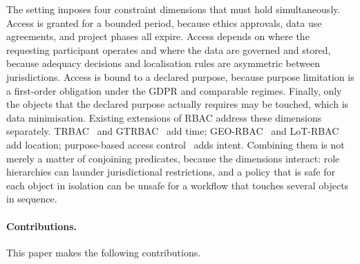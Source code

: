 \documentclass[11pt]{article}
\theoremstyle{definition}
\theoremstyle{plain}
\theoremstyle{remark}
\begin{document}
The setting imposes four constraint dimensions that must hold simultaneously.
Access is granted for a bounded period, because ethics approvals, data use
agreements, and project phases all expire. Access depends on where the
requesting participant operates and where the data are governed and stored,
because adequacy decisions and localisation rules are asymmetric between
jurisdictions. Access is bound to a declared purpose, because purpose
limitation is a first-order obligation under the GDPR and comparable regimes.
Finally, only the objects that the declared purpose actually requires may be
touched, which is data minimisation. Existing extensions of RBAC address these
dimensions separately. TRBAC~\citep{bertino2001trbac} and
GTRBAC~\citep{joshi2005gtrbac} add time; GEO-RBAC~\citep{bertino2005georbac}
and LoT-RBAC~\citep{chandran2005lotrbac} add location; purpose-based access
control~\citep{byun2008purpose} adds intent. Combining them is not merely a
matter of conjoining predicates, because the dimensions interact: role
hierarchies can launder jurisdictional restrictions, and a policy that is safe
for each object in isolation can be unsafe for a workflow that touches several
objects in sequence.

\paragraph{Contributions.} This paper makes the following contributions.
\end{document}
